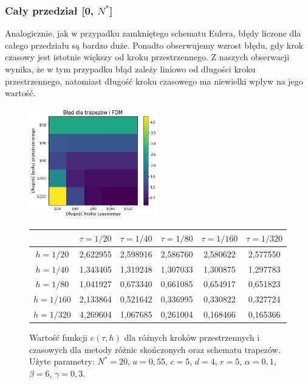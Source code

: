 \documentclass{article}
\begin{document}
		\subsubsection{Cały przedział [0, $N^{*}$]}
		Analogicznie, jak w przypadku zamkniętego schematu Eulera, błędy liczone dla całego przedziału są bardzo duże. Ponadto obserwujemy wzrost błędu, gdy krok czasowy jest istotnie większy od kroku przestrzennego. Z naszych obserwacji wynika, że w tym przypadku błąd zależy liniowo od długości kroku przestrzennego, natomiast długość kroku czasowego ma niewielki wpływ na jego wartość.
		\begin{figure}[h!]
			\caption{Wartość funkcji $e(\tau,h)$ dla różnych kroków przestrzennych i czasowych dla metody różnic skończonych oraz schematu trapezów. Użyte parametry: $N^{*}=20$, $a=0,55$, $c=5$, $d=4$, $r=5$, $\alpha=0,1$, $\beta=6$, $\gamma=0,3$. }
			\centering
			\includegraphics[width=0.5\textwidth]{images/blad_fdm_trapezy.pdf}
			\begin{tabular}{|c|c|c|c|c|c|}
				\hline
				&    $\tau=1/20$ &    $\tau=1/40$ &    $\tau=1/80$ &   $\tau=1/160$ &   $\tau=1/320$ \\
				\hline 
				$h=1/20$  &  2,622955 &	2,598916 &	2,586760 &	2,580622 &	2,577550 \\
				\hline
				$h=1/40$  & 1,343405 &	1,319248 &	1,307033 &	1,300875 &	1,297783 \\
				\hline
				$h=1/80$  &  1,041927 &	0,673340 &	0,661085 &	0,654917 &	0,651823 \\
				\hline
				$h=1/160$ &  2,133864 &	0,521642 &	0,336995 &	0,330822 &	0,327724 \\
				\hline
				$h=1/320$ &  4,269604 &	1,067685 &	0,261004 &	0,168466 &	0,165366 \\
				\hline
			\end{tabular}
		\end{figure}
\end{document}
